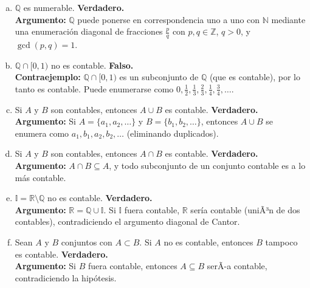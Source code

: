 \documentclass[12pt,a4paper]{article}
\begin{document}
\begin{enumerate}[a)]
    \item $\mathbb{Q}$ es numerable. \textbf{Verdadero.} \\
    \textbf{Argumento:} $\mathbb{Q}$ puede ponerse en correspondencia uno a uno con $\mathbb{N}$ mediante una enumeración diagonal de fracciones $\frac{p}{q}$ con $p, q \in \mathbb{Z}$, $q > 0$, y $\gcd(p, q) = 1$.

    \item $\mathbb{Q} \cap [0,1)$ no es contable. \textbf{Falso.} \\
    \textbf{Contraejemplo:} $\mathbb{Q} \cap [0,1)$ es un subconjunto de $\mathbb{Q}$ (que es contable), por lo tanto es contable. Puede enumerarse como $0, \frac{1}{2}, \frac{1}{3}, \frac{2}{3}, \frac{1}{4}, \frac{3}{4}, \dots$.

    \item Si $A$ y $B$ son contables, entonces $A \cup B$ es contable. \textbf{Verdadero.} \\
    \textbf{Argumento:} Si $A = \{a_1, a_2, \dots\}$ y $B = \{b_1, b_2, \dots\}$, entonces $A \cup B$ se enumera como $a_1, b_1, a_2, b_2, \dots$ (eliminando duplicados).

    \item Si $A$ y $B$ son contables, entonces $A \cap B$ es contable. \textbf{Verdadero.} \\
    \textbf{Argumento:} $A \cap B \subseteq A$, y todo subconjunto de un conjunto contable es a lo más contable.

    \item $\mathbb{I} = \mathbb{R} \setminus \mathbb{Q}$ no es contable. \textbf{Verdadero.} \\
    \textbf{Argumento:} $\mathbb{R} = \mathbb{Q} \cup \mathbb{I}$. Si $\mathbb{I}$ fuera contable, $\mathbb{R}$ sería contable (uniÃ³n de dos contables), contradiciendo el argumento diagonal de Cantor.

    \item Sean $A$ y $B$ conjuntos con $A \subset B$. Si $A$ no es contable, entonces $B$ tampoco es contable. \textbf{Verdadero.} \\
    \textbf{Argumento:} Si $B$ fuera contable, entonces $A \subseteq B$ serÃ-a contable, contradiciendo la hipótesis.
\end{enumerate}
\end{document}
